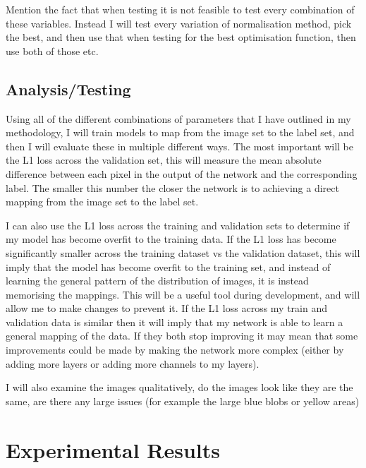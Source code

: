 \documentclass{UoYCSproject}
\begin{document}
Mention the fact that when testing it is not feasible to test every combination of these variables. Instead I will test every variation of normalisation method, pick the best, and then use that when testing for the best optimisation function, then use both of those etc. 

\subsection{Analysis/Testing}

Using all of the different combinations of parameters that I have outlined in my methodology, I will train models to map from the image set to the label set, and then I will evaluate these in multiple different ways. The most important will be the L1 loss across the validation set, this will measure the mean absolute difference between each pixel in the output of the network and the corresponding label. The smaller this number the closer the network is to achieving a direct mapping from the image set to the label set. 

I can also use the L1 loss across the training and validation sets to determine if my model has become overfit to the training data. If the L1 loss has become significantly smaller across the training dataset vs the validation dataset, this will imply that the model has become overfit to the training set, and instead of learning the general pattern of the distribution of images, it is instead memorising the mappings. This will be a useful tool during development, and will allow me to make changes to prevent it. If the L1 loss across my train and validation data is similar then it will imply that my network is able to learn a general mapping of the data. If they both stop improving it may mean that some improvements could be made by making the network more complex (either by adding more layers or adding more channels to my layers). 

I will also examine the images qualitatively, do the images look like they are the same, are there any large issues (for example the large blue blobs or yellow areas)

\newpage{}

\section{Experimental Results}


\end{document}
